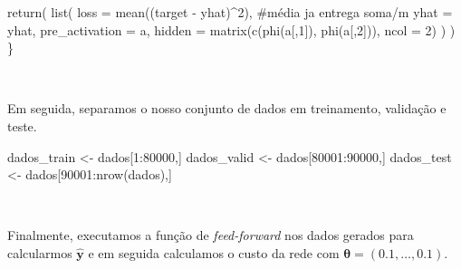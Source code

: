 \documentclass[
  a4paperpaper,
]{article}
\newenvironment{Shaded}{\begin{snugshade}}{\end{snugshade}}
\newcommand{\AttributeTok}[1]{\textcolor[rgb]{0.40,0.45,0.13}{#1}}
\newcommand{\CommentTok}[1]{\textcolor[rgb]{0.37,0.37,0.37}{#1}}
\newcommand{\DecValTok}[1]{\textcolor[rgb]{0.68,0.00,0.00}{#1}}
\newcommand{\FunctionTok}[1]{\textcolor[rgb]{0.28,0.35,0.67}{#1}}
\newcommand{\NormalTok}[1]{\textcolor[rgb]{0.00,0.23,0.31}{#1}}
\newcommand{\OtherTok}[1]{\textcolor[rgb]{0.00,0.23,0.31}{#1}}
\newcommand{\SpecialCharTok}[1]{\textcolor[rgb]{0.37,0.37,0.37}{#1}}
\begin{document}
\begin{Shaded}
\begin{Highlighting}[]
  \FunctionTok{return}\NormalTok{(}
    \FunctionTok{list}\NormalTok{(}
      \AttributeTok{loss =} \FunctionTok{mean}\NormalTok{((target }\SpecialCharTok{{-}}\NormalTok{ yhat)}\SpecialCharTok{\^{}}\DecValTok{2}\NormalTok{), }\CommentTok{\#média ja entrega soma/m}
      \AttributeTok{yhat =}\NormalTok{ yhat,}
      \AttributeTok{pre\_activation =}\NormalTok{ a,}
      \AttributeTok{hidden =} \FunctionTok{matrix}\NormalTok{(}\FunctionTok{c}\NormalTok{(}\FunctionTok{phi}\NormalTok{(a[,}\DecValTok{1}\NormalTok{]), }\FunctionTok{phi}\NormalTok{(a[,}\DecValTok{2}\NormalTok{])), }\AttributeTok{ncol =} \DecValTok{2}\NormalTok{)}
\NormalTok{    )}
\NormalTok{  )}
\NormalTok{\}}
\end{Highlighting}
\end{Shaded}

~

Em seguida, separamos o nosso conjunto de dados em treinamento,
validação e teste.

\begin{Shaded}
\begin{Highlighting}[]
\NormalTok{dados\_train }\OtherTok{\textless{}{-}}\NormalTok{ dados[}\DecValTok{1}\SpecialCharTok{:}\DecValTok{80000}\NormalTok{,]}
\NormalTok{dados\_valid }\OtherTok{\textless{}{-}}\NormalTok{ dados[}\DecValTok{80001}\SpecialCharTok{:}\DecValTok{90000}\NormalTok{,]}
\NormalTok{dados\_test }\OtherTok{\textless{}{-}}\NormalTok{ dados[}\DecValTok{90001}\SpecialCharTok{:}\FunctionTok{nrow}\NormalTok{(dados),]}
\end{Highlighting}
\end{Shaded}

~

Finalmente, executamos a função de \emph{feed-forward} nos dados gerados
para calcularmos \(\boldsymbol{\hat{y}}\) e em seguida calculamos o
custo da rede com \(\boldsymbol{\theta} = (0.1, \dots, 0.1)\).

\begin{Shaded}
\end{Shaded}
\end{document}
